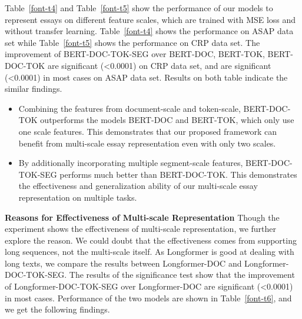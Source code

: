 \documentclass[11pt]{article}
\begin{document}
Table~\ref{font-t4} and Table~\ref{font-t5} show the performance of our models to represent essays on different feature scales, which are trained with MSE loss and without transfer learning.
Table~\ref{font-t4} shows the performance on ASAP data set while Table~\ref{font-t5} shows the performance on CRP data set. The improvement of BERT-DOC-TOK-SEG over BERT-DOC, BERT-TOK, BERT-DOC-TOK are significant (<0.0001) on CRP data set, and are significant (<0.0001) in most cases on ASAP data set.
Results on both table indicate the similar findings.
\begin{itemize}

\item Combining the features from document-scale and token-scale, BERT-DOC-TOK outperforms the models BERT-DOC and BERT-TOK, which only use one scale features.
This demonstrates that our proposed framework can benefit from multi-scale essay representation even with only two scales. 


\item By additionally incorporating multiple segment-scale features, BERT-DOC-TOK-SEG performs much better than BERT-DOC-TOK.
This demonstrates the effectiveness and generalization ability of our multi-scale essay representation on multiple tasks.




\begin{table}[h!]
\begin{center}
\caption{\label{font-t6} Performance of multi-scale Longformer models on ASAP data set.}
\end{center}
\end{table}

\end{itemize}

\textbf{Reasons for Effectiveness of Multi-scale Representation}
Though the experiment shows the effectiveness of multi-scale representation, we further explore the reason.
We could doubt that the effectiveness comes from supporting long sequences, not the multi-scale itself.
As Longformer is good at dealing with long texts, we compare the results between Longformer-DOC and Longformer-DOC-TOK-SEG. The results of the significance test show that the improvement of Longformer-DOC-TOK-SEG over Longformer-DOC are significant (<0.0001) in most cases. Performance of the two models are shown in Table~\ref{font-t6}, and we get the following findings. 
\end{document}
